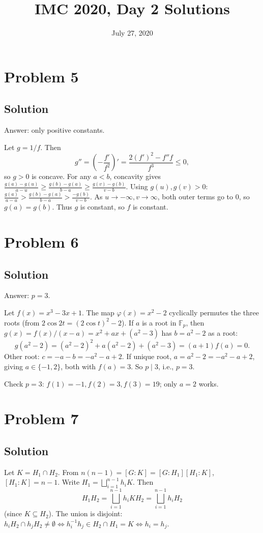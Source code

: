 \documentclass{article}
\title{IMC 2020, Day 2 Solutions}
\date{July 27, 2020}
\begin{document}
\maketitle

\section*{Problem 5}
\subsection*{Solution}
Answer: only positive constants.

Let $g = 1/f$. Then
\[ g'' = \left(-\frac{f'}{f^2}\right)' = \frac{2(f')^2 - f'' f}{f^3} \leq 0, \]
so $g > 0$ is concave. For any $a < b$, concavity gives $\frac{g(a) - g(u)}{a-u} \geq \frac{g(b) - g(a)}{b-a} \geq \frac{g(v) - g(b)}{v - b}$. Using $g(u), g(v) > 0$: $\frac{g(a)}{a-u} > \frac{g(b)-g(a)}{b-a} > \frac{-g(b)}{v-b}$. As $u \to -\infty, v \to \infty$, both outer terms go to $0$, so $g(a) = g(b)$. Thus $g$ is constant, so $f$ is constant.

\section*{Problem 6}
\subsection*{Solution}
Answer: $p = 3$.

Let $f(x) = x^3 - 3x + 1$. The map $\varphi(x) = x^2 - 2$ cyclically permutes the three roots (from $2\cos 2t = (2\cos t)^2 - 2$). If $a$ is a root in $\mathbb{F}_p$, then $g(x) = f(x)/(x-a) = x^2 + ax + (a^2 - 3)$ has $b = a^2 - 2$ as a root:
\[ g(a^2 - 2) = (a^2-2)^2 + a(a^2-2) + (a^2 - 3) = (a+1) f(a) = 0. \]
Other root: $c = -a - b = -a^2 - a + 2$. If unique root, $a = a^2 - 2 = -a^2 - a + 2$, giving $a \in \{-1, 2\}$, both with $f(a) = 3$. So $p \mid 3$, i.e., $p = 3$.

Check $p = 3$: $f(1) = -1, f(2) = 3, f(3) = 19$; only $a = 2$ works.

\section*{Problem 7}
\subsection*{Solution}
Let $K = H_1 \cap H_2$. From $n(n-1) = [G:K] = [G:H_1][H_1:K]$, $[H_1 : K] = n-1$. Write $H_1 = \bigsqcup_{i=1}^{n-1} h_i K$. Then
\[ H_1 H_2 = \bigsqcup_{i=1}^{n-1} h_i K H_2 = \bigsqcup_{i=1}^{n-1} h_i H_2 \]
(since $K \subseteq H_2$). The union is disjoint: $h_i H_2 \cap h_j H_2 \neq \emptyset \iff h_i^{-1} h_j \in H_2 \cap H_1 = K \iff h_i = h_j$.
\end{document}
